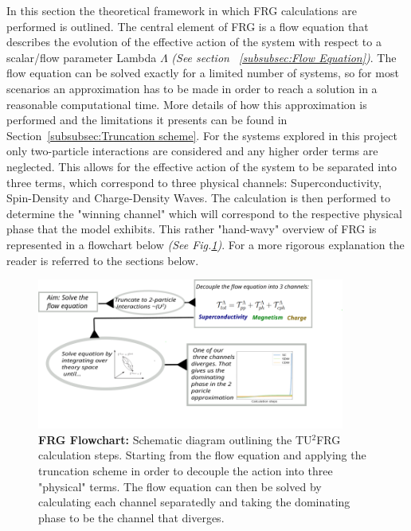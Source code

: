 \documentclass[12pt]{article}
\begin{document}
\medskip

\noindent In this section the theoretical framework in which FRG calculations are performed is outlined. The central element of FRG is a flow equation that describes the evolution of the effective action of the system with respect to a scalar/flow parameter Lambda $\Lambda$ \textit{(See section ~\ref{subsubsec:Flow Equation})}.
The flow equation can be solved exactly for a limited number of systems, so for most scenarios an approximation has to be made in order to reach a solution in a reasonable computational time. 
More details of how this approximation is performed and the limitations it presents can be found in Section~\ref{subsubsec:Truncation scheme}. For the systems explored in this project only two-particle
interactions are considered and any higher order terms are neglected.
This allows for the effective action of the system to be separated into three terms, which correspond to three physical channels: Superconductivity, Spin-Density and Charge-Density Waves.
The calculation is then performed to determine the "winning channel" which will correspond to the respective physical phase that the model exhibits. This rather "hand-wavy" overview of FRG is represented in a flowchart below \textit{ (See Fig.\ref{fig:FRGflowdiagram})}.
For a more rigorous explanation the reader is referred to the sections below. 

\begin{figure}[htbp]  %
    \centering
    \includegraphics[width=0.9\textwidth]{FRGflowdiagram.png}  %
    \caption{\textbf{FRG Flowchart:} Schematic diagram outlining the TU$^2$FRG calculation steps. Starting from the flow equation and applying the truncation scheme in order to decouple the action into three "physical" terms. 
    The flow equation can then be solved by calculating each channel separatedly and taking the dominating phase to be the channel that diverges.}
    \label{fig:FRGflowdiagram}
\end{figure}
\end{document}
